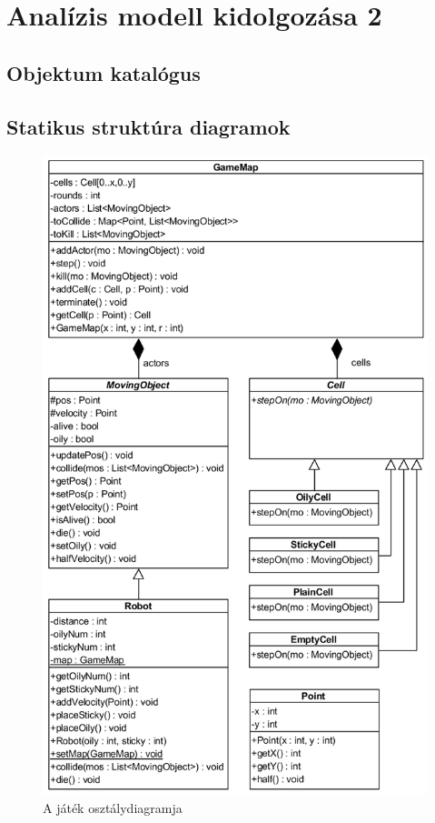 %
\chapter{Analízis modell kidolgozása 2}

\thispagestyle{fancy}

\section{Objektum katalógus}


\clearpage
\section{Statikus struktúra diagramok}

\begin{figure}[!htbp]
\begin{center}
\includegraphics[width=13cm]{./chapters/chapter04/static.png}
\caption{A játék osztálydiagramja}
\end{center}
\end{figure}


